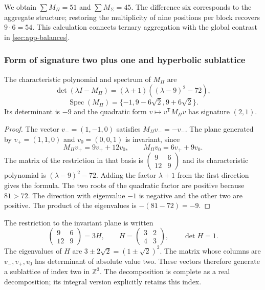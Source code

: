 We obtain $\sum M_\Pi=51$ and $\sum M_\Sigma=45$. The difference six corresponds to the aggregate structure; restoring the multiplicity of nine positions per block recovers $9\cdot6=54$. This calculation connects ternary aggregation with the global contrast in \cref{sec:app-balances}.

\subsubsection{Form of signature two plus one and hyperbolic sublattice}

\begin{teorema}
\label{geo:thm-espectro-agregado}
The characteristic polynomial and spectrum of $M_\Pi$ are
\[
 \det(\lambda I-M_\Pi)
 = (\lambda+1)((\lambda-9)^2-72),
\]
\[
 \operatorname{Spec}(M_\Pi)
 =\{-1,9-6\sqrt2,9+6\sqrt2\}.
\]
Its determinant is $-9$ and the quadratic form $v\mapsto v^{\mathsf T}M_\Pi v$ has signature $(2,1)$.
\end{teorema}

\begin{proof}
The vector $v_-=(1,-1,0)$ satisfies $M_\Pi v_-=-v_-$. The plane generated by $v_+=(1,1,0)$ and $v_0=(0,0,1)$ is invariant, since
\[
 M_\Pi v_+=9v_++12v_0,\qquad
 M_\Pi v_0=6v_++9v_0.
\]
The matrix of the restriction in that basis is $\left(\begin{smallmatrix}9&6\\12&9\end{smallmatrix}\right)$ and its characteristic polynomial is $(\lambda-9)^2-72$. Adding the factor $\lambda+1$ from the first direction gives the formula. The two roots of the quadratic factor are positive because $81>72$. The direction with eigenvalue $-1$ is negative and the other two are positive. The product of the eigenvalues is $-(81-72)=-9$.
\end{proof}

The restriction to the invariant plane is written
\[
 \begin{pmatrix}9&6\\12&9\end{pmatrix}
 =3H,\qquad
 H=\begin{pmatrix}3&2\\4&3\end{pmatrix},\qquad\det H=1.
\]
The eigenvalues of $H$ are $3\pm2\sqrt2=(1\pm\sqrt2)^2$. The matrix whose columns are $v_-,v_+,v_0$ has determinant of absolute value two. These vectors therefore generate a sublattice of index two in $\mathbb Z^3$. The decomposition is complete as a real decomposition; its integral version explicitly retains this index.

